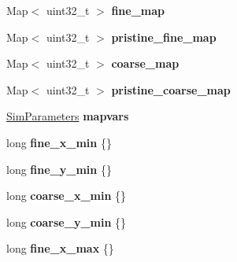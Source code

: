 \begin{DoxyCompactItemize}
\item 
Map$<$ uint32\+\_\+t $>$ {\bfseries fine\+\_\+map}\hypertarget{class_landscape_a8947e46b9be54b42a93fb0792d4a9ed4}{}\label{class_landscape_a8947e46b9be54b42a93fb0792d4a9ed4}

\item 
Map$<$ uint32\+\_\+t $>$ {\bfseries pristine\+\_\+fine\+\_\+map}\hypertarget{class_landscape_a7e2e62cbb3abfde813d7e4f07a79d44f}{}\label{class_landscape_a7e2e62cbb3abfde813d7e4f07a79d44f}

\item 
Map$<$ uint32\+\_\+t $>$ {\bfseries coarse\+\_\+map}\hypertarget{class_landscape_a58c8bb6432b578dac46bdbdba9e759c9}{}\label{class_landscape_a58c8bb6432b578dac46bdbdba9e759c9}

\item 
Map$<$ uint32\+\_\+t $>$ {\bfseries pristine\+\_\+coarse\+\_\+map}\hypertarget{class_landscape_aa1d40884f7423c474afae4e39b850387}{}\label{class_landscape_aa1d40884f7423c474afae4e39b850387}

\item 
\hyperlink{struct_sim_parameters}{Sim\+Parameters} {\bfseries mapvars}\hypertarget{class_landscape_a15ee76efb1e0c8f4f3b4bb902a34ed4f}{}\label{class_landscape_a15ee76efb1e0c8f4f3b4bb902a34ed4f}

\item 
long {\bfseries fine\+\_\+x\+\_\+min} \{\}\hypertarget{class_landscape_a95634ae0e15826160ad5c58a4093130d}{}\label{class_landscape_a95634ae0e15826160ad5c58a4093130d}

\item 
long {\bfseries fine\+\_\+y\+\_\+min} \{\}\hypertarget{class_landscape_a90e7fe904c80133338ac19aa13534ef9}{}\label{class_landscape_a90e7fe904c80133338ac19aa13534ef9}

\item 
long {\bfseries coarse\+\_\+x\+\_\+min} \{\}\hypertarget{class_landscape_a39dba789588465fe23055988ac52f217}{}\label{class_landscape_a39dba789588465fe23055988ac52f217}

\item 
long {\bfseries coarse\+\_\+y\+\_\+min} \{\}\hypertarget{class_landscape_a23b1484f4694fbc2a7c79af8d5e3fce5}{}\label{class_landscape_a23b1484f4694fbc2a7c79af8d5e3fce5}

\item 
long {\bfseries fine\+\_\+x\+\_\+max} \{\}\hypertarget{class_landscape_ac52242e6c558deb9a80478497d7320bc}{}\label{class_landscape_ac52242e6c558deb9a80478497d7320bc}


\end{DoxyCompactItemize}
